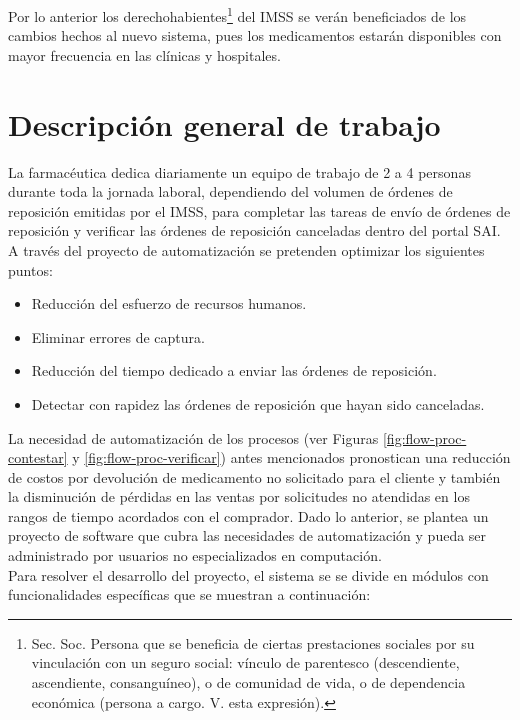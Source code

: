 Por lo anterior los derechohabientes\footnote{Sec. Soc. Persona que se beneficia de ciertas prestaciones sociales por su vinculación con un seguro social: vínculo de parentesco (descendiente, ascendiente, consanguíneo), o de comunidad de vida, o de dependencia económica (persona a cargo. V. esta expresión)\cite{juridica}.} del IMSS se verán beneficiados de los cambios hechos al nuevo sistema, pues los medicamentos estarán disponibles con mayor frecuencia en las clínicas y hospitales.

\section{Descripción general de trabajo}
La farmacéutica dedica diariamente un equipo de trabajo de 2 a 4 personas durante toda la jornada laboral, dependiendo del volumen de órdenes de reposición emitidas por el IMSS, para completar las tareas de envío de órdenes de reposición y verificar las órdenes de reposición canceladas dentro del portal SAI. A través del proyecto de automatización se pretenden optimizar los siguientes puntos:
\begin{itemize}
\item Reducción del esfuerzo de recursos humanos.
\item Eliminar errores de captura.
\item Reducción del tiempo dedicado a enviar las órdenes de reposición.
\item Detectar con rapidez las órdenes de reposición que hayan sido canceladas.
\end{itemize}
La necesidad de automatización de los procesos (ver Figuras \ref{fig:flow-proc-contestar} y \ref{fig:flow-proc-verificar}) antes mencionados pronostican una reducción de costos por devolución de medicamento no solicitado para el cliente y también la disminución de pérdidas en las ventas por solicitudes no atendidas en los rangos de tiempo acordados con el comprador. Dado lo anterior, se plantea un proyecto de software que cubra las necesidades de automatización y pueda ser administrado por usuarios no especializados en computación.\\
Para resolver el desarrollo del proyecto, el sistema se se divide en módulos con funcionalidades específicas que se muestran a continuación:
